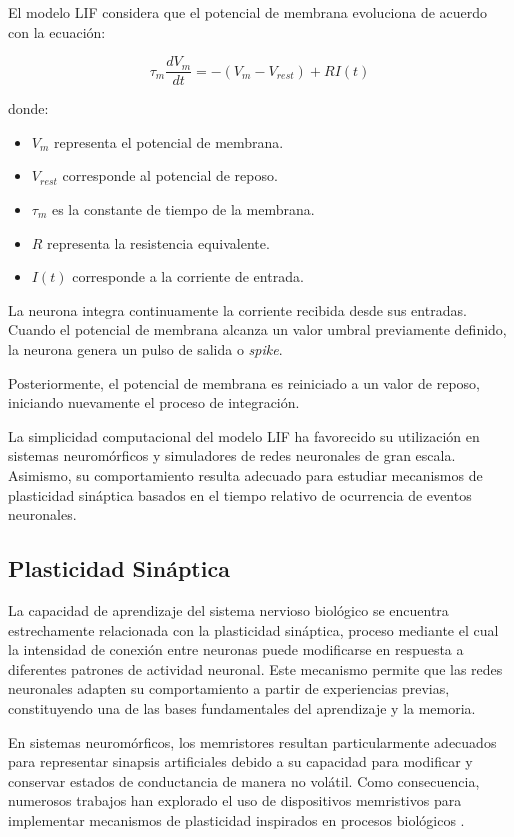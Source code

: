 El modelo LIF considera que el potencial de membrana evoluciona de acuerdo con la ecuación:

\begin{equation}
\tau_m \frac{dV_m}{dt}=-(V_m-V_{rest})+RI(t)
\end{equation}

donde:

\begin{itemize}
\item $V_m$ representa el potencial de membrana.
\item $V_{rest}$ corresponde al potencial de reposo.
\item $\tau_m$ es la constante de tiempo de la membrana.
\item $R$ representa la resistencia equivalente.
\item $I(t)$ corresponde a la corriente de entrada.
\end{itemize}

La neurona integra continuamente la corriente recibida desde sus entradas. Cuando el potencial de membrana alcanza un valor umbral previamente definido, la neurona genera un pulso de salida o \textit{spike}.

Posteriormente, el potencial de membrana es reiniciado a un valor de reposo, iniciando nuevamente el proceso de integración.

La simplicidad computacional del modelo LIF ha favorecido su utilización en sistemas neuromórficos y simuladores de redes neuronales de gran escala. Asimismo, su comportamiento resulta adecuado para estudiar mecanismos de plasticidad sináptica basados en el tiempo relativo de ocurrencia de eventos neuronales.

\subsection{Plasticidad Sináptica}

La capacidad de aprendizaje del sistema nervioso biológico se encuentra estrechamente relacionada con la plasticidad sináptica, proceso mediante el cual la intensidad de conexión entre neuronas puede modificarse en respuesta a diferentes patrones de actividad neuronal. Este mecanismo permite que las redes neuronales adapten su comportamiento a partir de experiencias previas, constituyendo una de las bases fundamentales del aprendizaje y la memoria.

En sistemas neuromórficos, los memristores resultan particularmente adecuados para representar sinapsis artificiales debido a su capacidad para modificar y conservar estados de conductancia de manera no volátil. Como consecuencia, numerosos trabajos han explorado el uso de dispositivos memristivos para implementar mecanismos de plasticidad inspirados en procesos biológicos \cite{2,3}.

